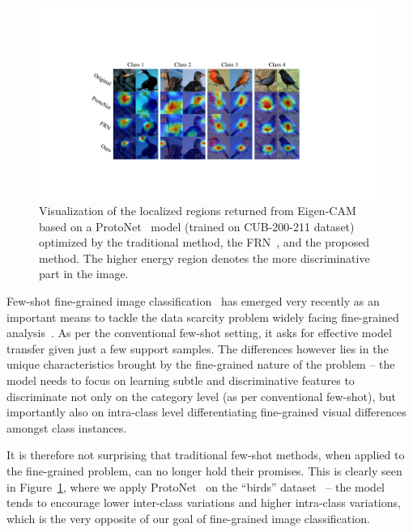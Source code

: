 \documentclass[letterpaper]{article} %
\begin{document}
\begin{figure}[!htp]
  \centering
  \includegraphics[width=0.85\linewidth]{figures/1.1.pdf}
  \caption{Visualization of the localized regions returned from Eigen-CAM~\cite{muhammad2020eigen} based on a ProtoNet~\cite{NIPS2017_cb8da676} model (trained on CUB-200-211 dataset) optimized by the traditional method, the FRN~\cite{Wertheimer_2021_CVPR}, and the proposed method. The higher energy region denotes the more discriminative part in the image.}
  \label{fig:1}
\end{figure}



Few-shot fine-grained image classification~\cite{Huang2021LowRankPA,9293172} has emerged very recently as an important means to tackle the data scarcity problem widely facing fine-grained analysis~\cite{3401454f29a841a29142c97833857e78}. As per the conventional few-shot setting, it asks for effective model transfer given just a few support samples. The differences however lies in the unique characteristics brought by the fine-grained nature of the problem -- the model needs to focus on learning subtle and discriminative features to discriminate not only on the category level (as per conventional few-shot), but importantly also on intra-class level differentiating fine-grained visual differences amongst class instances.

It is therefore not surprising that traditional few-shot methods, when applied to the {fine-grained} problem, can no longer hold their promises. This is clearly seen in Figure~\ref{fig:1}, where we apply ProtoNet~\cite{NIPS2017_cb8da676} on the ``birds'' dataset~\cite{WelinderEtal2010} -- the model {tends to encourage} lower inter-class variations and higher intra-class variations, which is the very opposite of our goal of fine-grained image classification.
\end{document}
